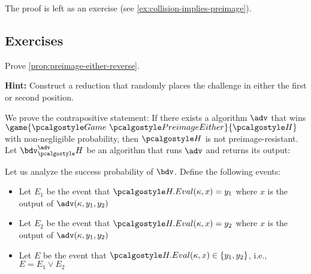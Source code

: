 The proof is left as an exercise (see \autoref{ex:collision-implies-preimage}).

\subsection{Exercises}

\begin{exercise}\label{ex:preimage-either-reverse}
  Prove \autoref{prop:preimage-either-reverse}.
  
  \textbf{Hint:} Construct a reduction that randomly places the challenge in either the first or second position.
\end{exercise}

\ifsolutions
\begin{mysolution}
  We prove the contrapositive statement:
  If there exists a \ppt algorithm $\adv$ that wins $\game{\Game~\algo{PreimageEither}}{\algo{H}}$ with non-negligible probability, then $\algo{H}$ is not preimage-resistant.
  Let $\bdv^\adv_\algo{H}$ be an algorithm that runs $\adv$ and returns its output:

  \begin{center}
    \begin{tcolorbox}[width=6cm]
      \begin{pchstack}[center]
      \end{pchstack}
    \end{tcolorbox}
  \end{center}
  
  Let us analyze the success probability of $\bdv$.
  Define the following events:
  \begin{itemize}
    \item Let $E_1$ be the event that $\algo{H.Eval}(\kappa, x) = y_1$ where $x$ is the output of $\adv(\kappa, y_1, y_2)$
    \item Let $E_2$ be the event that $\algo{H.Eval}(\kappa, x) = y_2$ where $x$ is the output of $\adv(\kappa, y_1, y_2)$
    \item Let $E$ be the event that $\algo{H.Eval}(\kappa, x) \in \{y_1, y_2\}$, i.e., $E = E_1 \vee E_2$
  \end{itemize}
  

\end{mysolution}
